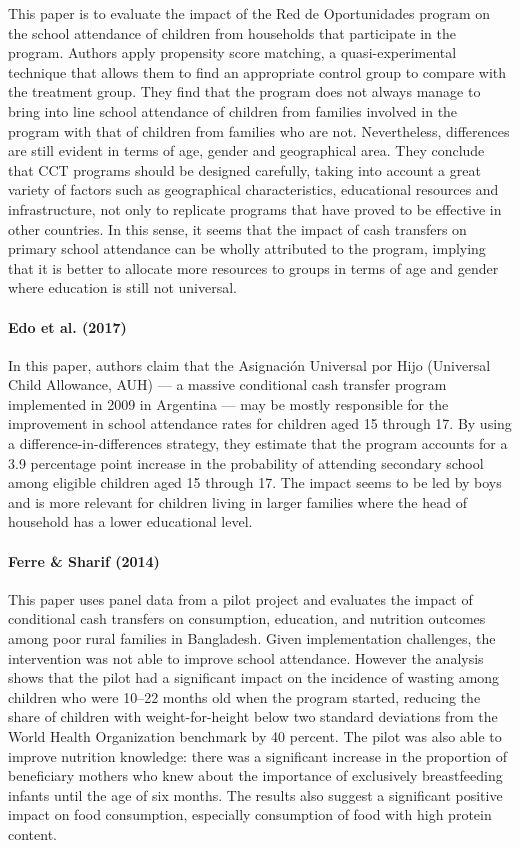 \documentclass[a4paper, 10pt]{article}
\begin{document}
This paper is to evaluate the impact of the Red de Oportunidades program on the school attendance of children from households that participate in the program. Authors apply propensity score matching, a quasi-experimental technique that allows them to find an appropriate control group to compare with the treatment group. They find that the program does not always manage to bring into line school attendance of children from families involved in the program  with that of children from families who are not. Nevertheless, differences are still evident in terms of age, gender and geographical area. They conclude that CCT programs should be designed carefully, taking into account a great variety of factors such as geographical characteristics, educational resources and infrastructure, not only to replicate programs that have proved to be effective in other countries. In this sense, it seems that the impact of cash transfers on primary school attendance can be wholly attributed to the program, implying that it is better to allocate more resources to groups in terms of age and gender where education is still not universal.

\paragraph{Edo et al. (2017)}

In this paper, authors claim that the Asignación Universal por Hijo (Universal Child Allowance, AUH) — a massive conditional cash transfer program implemented in 2009 in Argentina — may be mostly responsible for the improvement in school attendance rates for children aged 15 through 17. By using a difference-in-differences strategy, they estimate that the program accounts for a 3.9 percentage point increase in the probability of attending secondary school among eligible children aged 15 through 17. The impact seems to be led by boys and is more relevant for children living in larger families where the head of household has a lower educational level.

\paragraph{Ferre \& Sharif (2014)}

This paper uses panel data from a pilot project and evaluates the impact of conditional cash transfers on consumption, education, and nutrition outcomes among poor rural families in Bangladesh. Given implementation challenges, the intervention was not able to improve school attendance. However the analysis shows that the pilot had a significant impact on the incidence of wasting among children who were 10–22 months old when the program started, reducing the share of children with weight-for-height below two standard deviations from the World Health Organization benchmark by 40 percent. The pilot was also able to improve nutrition knowledge: there was a significant increase in the proportion of beneficiary mothers who knew about the importance of exclusively breastfeeding infants until the age of six months. The results also suggest a significant positive impact on food consumption, especially consumption of food with high protein content.
\end{document}
